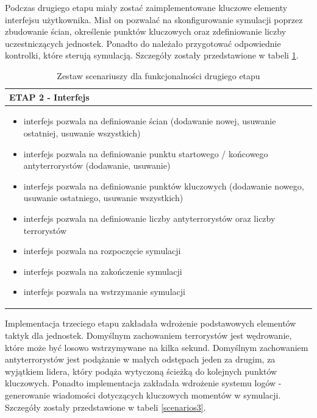 Podczas drugiego etapu miały zostać zaimplementowane kluczowe elementy interfejsu użytkownika. Miał on pozwalać na skonfigurowanie symulacji poprzez zbudowanie ścian, określenie punktów kluczowych oraz zdefiniowanie liczby uczestniczących jednostek. Ponadto do należało przygotować odpowiednie kontrolki, które sterują symulacją. Szczegóły zostały przedstawione w tabeli \ref{scenarios2}. 

\begin{table}
\begin{center}
\begin{tabular}{|p{}|}
\hline
ETAP 2 - Interfejs\\\hline
	\begin{itemize}
		\setlength\itemsep{0pt}
		\item interfejs pozwala na definiowanie ścian (dodawanie nowej, usuwanie ostatniej, usuwanie wszystkich)
		\item interfejs pozwala na definiowanie punktu startowego / końcowego antyterrorystów (dodawanie, usuwanie)
		\item interfejs pozwala na definiowanie punktów kluczowych (dodawanie nowego, usuwanie ostatniego, usuwanie wszystkich)
		\item interfejs pozwala na definiowanie liczby antyterrorystów oraz liczby terrorystów
		\item interfejs pozwala na rozpoczęcie symulacji
		\item interfejs pozwala na zakończenie symulacji
		\item interfejs pozwala na wstrzymanie symulacji
	\end{itemize}
\\\hline
\end{tabular}
\caption {Zestaw scenariuszy dla funkcjonalności drugiego etapu\label{scenarios2}}
\end{center}
\end{table} 

Implementacja trzeciego etapu zakładała wdrożenie podstawowych elementów taktyk dla jednostek. Domyślnym zachowaniem terrorystów jest wędrowanie, które może być losowo wstrzymywane na kilka sekund. Domyślnym zachowaniem antyterrorystów jest podążanie w małych odstępach jeden za drugim, za wyjątkiem lidera, który podąża wytyczoną ścieżką do kolejnych punktów kluczowych. Ponadto implementacja zakładała wdrożenie systemu logów - generowanie wiadomości dotyczących kluczowych momentów w symulacji. Szczegóły zostały przedstawione w tabeli \ref{scenarios3}.

